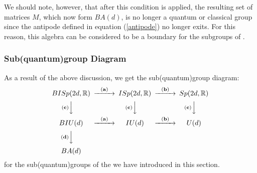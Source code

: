 We should note, however, that after this condition is applied, the
resulting set of matrices $M$, which now form $BA(d)$, is
no longer a quantum or classical group since the antipode defined
in equation (\ref{antipode}) no longer exits. For this reason,
this algebra can be considered to be a boundary for the
subgroups of \BISp.

\subsubsection{Sub(quantum)group Diagram}
As a result of the above discussion, we get the sub(quantum)group
diagram:
\[
\begin{CD}
{BISp(2d, \IR)} @>{\bf (a)}>> {ISp(2d, \IR)} @>{\bf (b)}>> {Sp(2d, \IR)} \\
@V{\bf (c)}VV @V{\bf (c)}VV @V{\bf (c)}VV \\
{BIU(d)} @>{\bf (a)}>> {IU(d)} @>{\bf (b)}>> {U(d)} \\
@V{\bf (d)}VV \\
{BA(d)}
\end{CD}
\]
for the sub(quantum)groups of the \BISp we have introduced in this
section.

